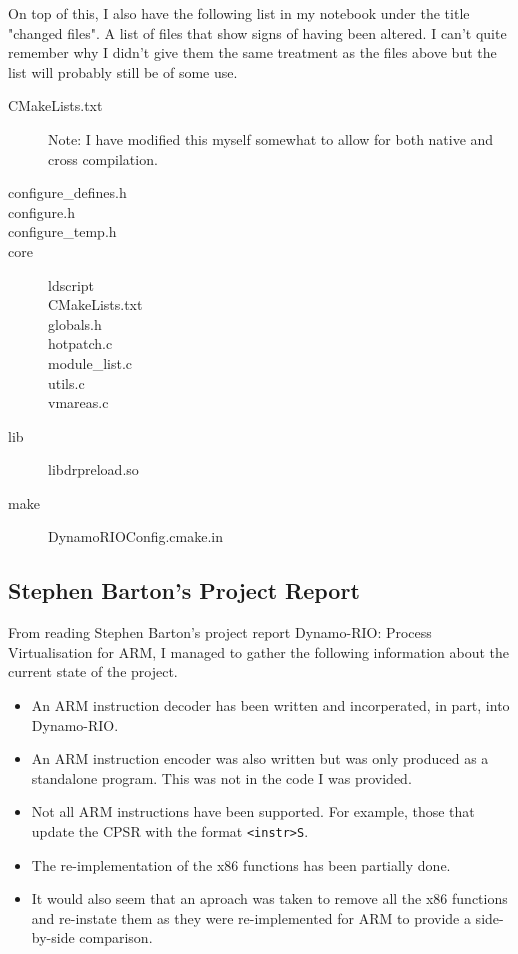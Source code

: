 \documentclass[a4paper]{article}
\begin{document}
On top of this, I also have the following list in my notebook under the title
"changed files". A list of files that show signs of having been altered. I can't
quite remember why I didn't give them the same treatment as the files above but
the list will probably still be of some use.
\begin{description}
\item[CMakeLists.txt] Note: I have modified this myself somewhat to allow for
both native and cross compilation.
\item[configure\_defines.h]
\item[configure.h]
\item[configure\_temp.h]
\item[core]
 \begin{description}
 \item[ldscript]
 \item[CMakeLists.txt]
 \item[globals.h]
 \item[hotpatch.c]
 \item[module\_list.c]
 \item[utils.c]
 \item[vmareas.c]
 \end{description}
\item[lib]
 \begin{description}
 \item[libdrpreload.so]
 \end{description}
\item[make]
 \begin{description}
 \item[DynamoRIOConfig.cmake.in]
 \end{description}
\end{description}

\subsection{Stephen Barton's Project Report}
From reading Stephen Barton's project report Dynamo-RIO: Process Virtualisation
for ARM, I managed to gather the following information about the current state
of the project.
\begin{itemize}
\item An ARM instruction decoder has been written and incorperated, in part,
into Dynamo-RIO.
\item An ARM instruction encoder was also written but was only produced as a
standalone program. This was not in the code I was provided.
\item Not all ARM instructions have been supported. For example, those that
update the CPSR with the format \texttt{<instr>S}.
\item The re-implementation of the x86 functions has been partially done.
\item It would also seem that an aproach was taken to remove all the x86
functions and re-instate them as they were re-implemented for ARM to provide a
side-by-side comparison.
\end{itemize}
\end{document}
